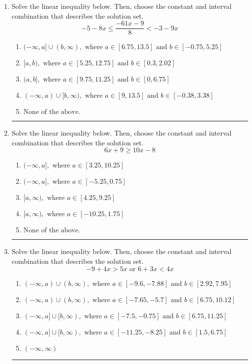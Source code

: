 \documentclass[14pt]{extbook}
\newcommand{\litem}[1]{\item#1\hspace*{-1cm}\rule{\textwidth}{0.4pt}}
\begin{document}
\begin{enumerate}
{\begin{enumerate}[label=\Alph*.]
\end{enumerate} }
\litem{
Solve the linear inequality below. Then, choose the constant and interval combination that describes the solution set.\[ -5 - 8 x \leq \frac{-61 x - 9}{8} < -3 - 9 x \]\begin{enumerate}[label=\Alph*.]
\item \( (-\infty, a] \cup (b, \infty), \text{ where } a \in [6.75, 13.5] \text{ and } b \in [-0.75, 5.25] \)
\item \( [a, b), \text{ where } a \in [5.25, 12.75] \text{ and } b \in [0.3, 2.02] \)
\item \( (a, b], \text{ where } a \in [9.75, 11.25] \text{ and } b \in [0, 6.75] \)
\item \( (-\infty, a) \cup [b, \infty), \text{ where } a \in [9, 13.5] \text{ and } b \in [-0.38, 3.38] \)
\item \( \text{None of the above.} \)

\end{enumerate} }
\litem{
Solve the linear inequality below. Then, choose the constant and interval combination that describes the solution set.\[ 6x + 9 \geq 10x -8 \]\begin{enumerate}[label=\Alph*.]
\item \( (-\infty, a], \text{ where } a \in [3.25, 10.25] \)
\item \( (-\infty, a], \text{ where } a \in [-5.25, 0.75] \)
\item \( [a, \infty), \text{ where } a \in [4.25, 9.25] \)
\item \( [a, \infty), \text{ where } a \in [-10.25, 1.75] \)
\item \( \text{None of the above}. \)

\end{enumerate} }
\litem{
Solve the linear inequality below. Then, choose the constant and interval combination that describes the solution set.\[ -9 + 4 x > 5 x \text{ or } 6 + 3 x < 4 x \]\begin{enumerate}[label=\Alph*.]
\item \( (-\infty, a) \cup (b, \infty), \text{ where } a \in [-9.6, -7.88] \text{ and } b \in [2.92, 7.95] \)
\item \( (-\infty, a) \cup (b, \infty), \text{ where } a \in [-7.65, -5.7] \text{ and } b \in [6.75, 10.12] \)
\item \( (-\infty, a] \cup [b, \infty), \text{ where } a \in [-7.5, -0.75] \text{ and } b \in [6.75, 11.25] \)
\item \( (-\infty, a] \cup [b, \infty), \text{ where } a \in [-11.25, -8.25] \text{ and } b \in [1.5, 6.75] \)
\item \( (-\infty, \infty) \)


\end{enumerate}}
\end{enumerate}
\end{document}
